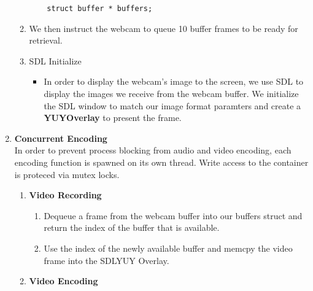 \documentclass[a4paper]{article}
\begin{document}
\begin{enumerate}
\begin{enumerate}
\begin{verbatim}
	struct buffer * buffers;

			\end{verbatim}
		\item We then instruct the webcam to queue 10 buffer frames to be ready for retrieval.
		\item SDL Initialize
			\begin{itemize}
				\item In order to display the webcam's image to the screen, we use SDL to display the images we receive from the webcam buffer. We initialize the SDL window to match our image format paramters and create a \textbf{YUYOverlay} to present the frame.
			\end{itemize}
	\end{enumerate}
\item \textbf{Concurrent Encoding}
		\\ In order to prevent process blocking from audio and video encoding, each encoding function is spawned on its own thread. Write access to the container is proteced via mutex locks.
	\begin{enumerate}
		\item \textbf{Video Recording}
			\begin{enumerate}
				\item {} Dequeue a frame from the webcam buffer into our buffers struct and return the index of the buffer that is available.
				\item {} Use the index of the newly available buffer and memcpy the video frame into the SDLYUY Overlay.
			\end{enumerate}
		\item \textbf{Video Encoding}	
\end{enumerate}
\end{enumerate}
\end{document}

